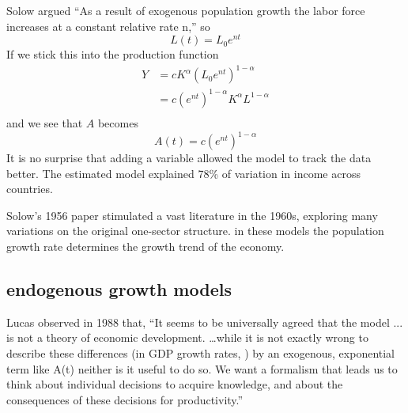 Solow argued ``As a result of exogenous population growth the labor force increases at a constant relative rate n,'' so
  \[L(t)= L_0e^{nt}\] 
If we stick this into the production function 
 \begin{eqnarray}
 Y&=cK^\alpha (L_0e^{nt})^{1-\alpha}\\
    &=c(e^{nt})^{1-\alpha}K^\alpha L^{1-\alpha}\\
 \end{eqnarray}
and we see that $A$ becomes
 \[A(t)=c(e^{nt})^{1-\alpha}\]
It is no surprise that adding a variable allowed the model to track the data better. The estimated model explained 78\% of variation in income across countries.


Solow's 1956 paper stimulated a vast literature in the 1960s, exploring many variations on the original one-sector structure. %
in these models the population growth rate determines the growth trend of the economy.



\subsection{endogenous growth models}
Lucas observed  in 1988 that, ``It seems to be universally agreed that the model ... is not a theory of economic development.   \dots while it is not exactly wrong to describe these differences (in GDP  growth rates, ) by an exogenous, exponential term like A(t) neither is it useful to do so. We want a formalism that leads us to think about individual decisions to acquire knowledge, and about the consequences of these decisions for productivity.''

